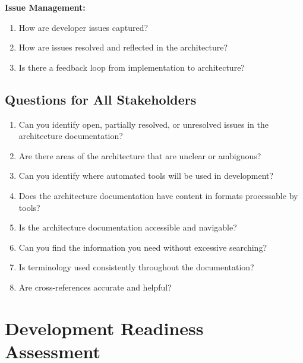 \documentclass[11pt]{article}
\begin{document}
\begin{questionbox}
\textbf{Issue Management:}
\begin{enumerate}[resume]
    \item How are developer issues captured?
    \item How are issues resolved and reflected in the architecture?
    \item Is there a feedback loop from implementation to architecture?
\end{enumerate}
\end{questionbox}

\subsection{Questions for All Stakeholders}

\begin{questionbox}

\begin{enumerate}
    \item Can you identify open, partially resolved, or unresolved issues in the architecture documentation?
    
    \item Are there areas of the architecture that are unclear or ambiguous?
    
    \item Can you identify where automated tools will be used in development?
    
    \item Does the architecture documentation have content in formats processable by tools?
    
    \item Is the architecture documentation accessible and navigable?
    
    \item Can you find the information you need without excessive searching?
    
    \item Is terminology used consistently throughout the documentation?
    
    \item Are cross-references accurate and helpful?
\end{enumerate}
\end{questionbox}

\section{Development Readiness Assessment}
\end{document}
